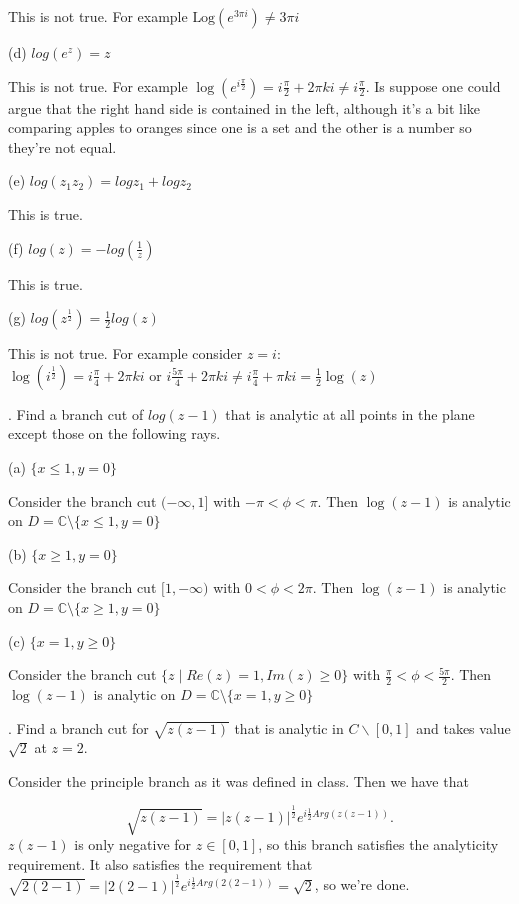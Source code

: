 \documentclass[letterpaper, reqno,11pt]{article}
\begin{document}
This is not true. For example $\text{Log}(e^{3\pi i})\neq 3\pi i$

(d) $ log (e^z)=z$

This is not true. For example $ \log\left( e^{i\frac{\pi}{2}} \right)=i\frac{\pi}{2}+2\pi ki \neq i\frac{\pi}{2}$. Is suppose one could argue that the right hand side is contained in the left, although it's a bit like comparing apples to oranges since one is a set and the other is a number so they're not equal. 

(e) $ log (z_1 z_2)=log z_1+ log z_2 $

This is true. 

(f) $ log (z)=- log (\frac{1}{z})$

This is true. 

(g) $ log (z^{\frac{1}{2}})=\frac{1}{2} log (z)$

This is not true. For example consider $z=i$: $\log(i^{\frac{1}{2}})=i \frac{\pi}{4}+2\pi k i\text{ or }i \frac{5\pi}{4}+2\pi k i\neq i \frac{\pi}{4}+\pi k i=\frac{1}{2}\log(z)$

\medskip


. Find a branch cut of $ log (z-1)$ that is analytic at all points in the plane except those on the following rays.

(a) $ \{ x\leq 1, y=0 \}$

Consider the branch cut $(-\infty, 1]$ with $-\pi<\phi<\pi$. Then $ \log(z-1)$ is analytic on $D=\mathbb{C}\setminus\{ x\leq 1, y=0 \}$

(b) $ \{ x \geq 1, y=0 \}$

Consider the branch cut $[1, -\infty)$ with $0<\phi<2\pi$. Then $ \log(z-1)$ is analytic on $D=\mathbb{C}\setminus\{ x\geq 1, y=0 \}$

(c) $\{ x=1, y \geq 0 \}$

Consider the branch cut $\{z\mid Re(z)=1, Im(z)\geq 0\} $ with $\frac{\pi}{2}<\phi <\frac{5\pi}{2}$. Then $ \log(z-1)$ is analytic on $D=\mathbb{C}\setminus\{ x= 1, y\geq 0 \}$


\medskip




\medskip


. Find a branch cut for $\sqrt{z (z-1)}$ that is analytic in $ C \backslash [0, 1]$ and takes value $ \sqrt{2} $ at $z=2$.

Consider the principle branch as it was defined in class. Then we have that 

\[
\sqrt{z(z-1)} =|z(z-1)|^{\frac{1}{2}}e^{i \frac{1}{2}Arg(z(z-1))}
.\]
$z(z-1)$ is only negative for $z\in[0, 1]$, so this branch satisfies the analyticity requirement. It also satisfies the requirement that $\sqrt{2(2-1)} =|2(2-1)|^{\frac{1}{2}}e^{i \frac{1}{2}Arg(2(2-1))}=\sqrt{2} $, so we're done. 
\end{document}
